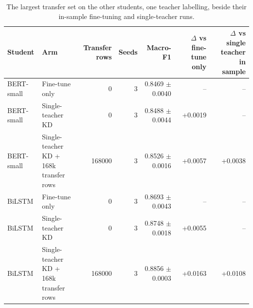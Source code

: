 \begin{table}[t]
\centering
\caption{The largest transfer set on the other students, one teacher labelling, beside their in-sample fine-tuning and single-teacher runs.}
\label{tab:scaling-students}
\begin{tabular}{llrrrrr}
\toprule
Student & Arm & Transfer rows & Seeds & Macro-F1 & $\Delta$ vs fine-tune only & $\Delta$ vs single teacher in sample \\
\midrule
BERT-small & Fine-tune only & 0 & 3 & 0.8469 $\pm$ 0.0040 & -- & -- \\
BERT-small & Single-teacher KD & 0 & 3 & 0.8488 $\pm$ 0.0044 & +0.0019 & -- \\
BERT-small & Single-teacher KD + 168k transfer rows & 168000 & 3 & 0.8526 $\pm$ 0.0016 & +0.0057 & +0.0038 \\
BiLSTM & Fine-tune only & 0 & 3 & 0.8693 $\pm$ 0.0043 & -- & -- \\
BiLSTM & Single-teacher KD & 0 & 3 & 0.8748 $\pm$ 0.0018 & +0.0055 & -- \\
BiLSTM & Single-teacher KD + 168k transfer rows & 168000 & 3 & 0.8856 $\pm$ 0.0003 & +0.0163 & +0.0108 \\
\bottomrule
\end{tabular}
\end{table}